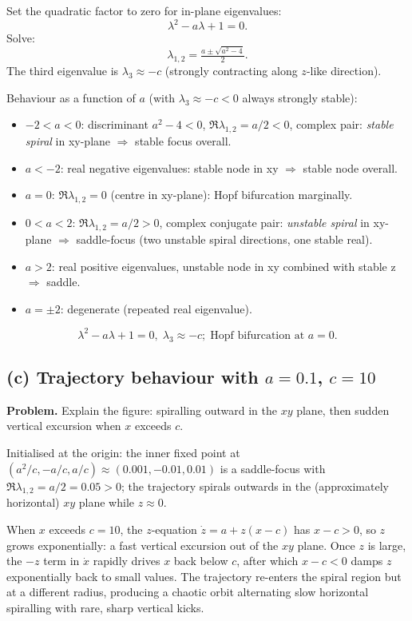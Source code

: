 \documentclass[11pt]{article}
\begin{document}
Set the quadratic factor to zero for in-plane eigenvalues:
\[
\lambda^2 - a\lambda + 1 = 0.
\]
Solve:
\[
\lambda_{1,2} = \tfrac{a\pm\sqrt{a^2 - 4}}{2}.
\]
The third eigenvalue is $\lambda_3 \approx -c$ (strongly contracting along $z$-like direction).

Behaviour as a function of $a$ (with $\lambda_3\approx -c<0$ always strongly stable):
\begin{itemize}
\item $-2<a<0$: discriminant $a^2-4<0$, $\Re\lambda_{1,2} = a/2 < 0$, complex pair: \emph{stable spiral} in xy-plane $\Rightarrow$ stable focus overall.
\item $a < -2$: real negative eigenvalues: stable node in xy $\Rightarrow$ stable node overall.
\item $a = 0$: $\Re\lambda_{1,2}=0$ (centre in xy-plane): Hopf bifurcation marginally.
\item $0 < a < 2$: $\Re\lambda_{1,2} = a/2 > 0$, complex conjugate pair: \emph{unstable spiral} in xy-plane $\Rightarrow$ saddle-focus (two unstable spiral directions, one stable real).
\item $a > 2$: real positive eigenvalues, unstable node in xy combined with stable z $\Rightarrow$ saddle.
\item $a=\pm 2$: degenerate (repeated real eigenvalue).
\end{itemize}
\[
\boxed{\;\lambda^2 - a\lambda + 1 = 0,\;\lambda_3\approx -c;\;\text{Hopf bifurcation at }a=0.\;}
\]

\subsection*{(c) Trajectory behaviour with $a=0.1$, $c=10$}

\textbf{Problem.} Explain the figure: spiralling outward in the $xy$ plane, then sudden vertical excursion when $x$ exceeds $c$.

Initialised at the origin: the inner fixed point at $(a^2/c, -a/c, a/c) \approx (0.001, -0.01, 0.01)$ is a saddle-focus with $\Re\lambda_{1,2} = a/2 = 0.05 > 0$; the trajectory spirals outwards in the (approximately horizontal) $xy$ plane while $z\approx 0$.

When $x$ exceeds $c=10$, the $z$-equation $\dot z = a + z(x-c)$ has $x-c>0$, so $z$ grows exponentially: a fast vertical excursion out of the $xy$ plane. Once $z$ is large, the $-z$ term in $\dot x$ rapidly drives $x$ back below $c$, after which $x-c<0$ damps $z$ exponentially back to small values. The trajectory re-enters the spiral region but at a different radius, producing a chaotic orbit alternating slow horizontal spiralling with rare, sharp vertical kicks.
\end{document}
